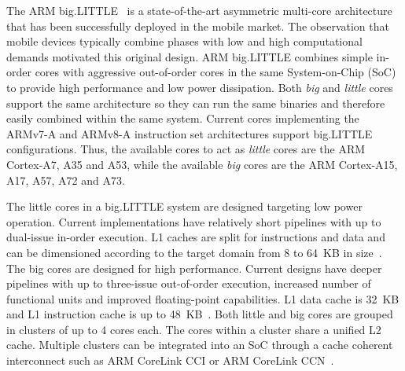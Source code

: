 
The ARM big.LITTLE~\cite{samsung, Greenhalgh2011} is a state-of-the-art asymmetric multi-core architecture that has been successfully deployed in the mobile market. The observation that mobile devices typically combine phases with low and high computational demands motivated this original design. ARM big.LITTLE combines simple in-order cores with aggressive out-of-order cores in the same System-on-Chip (SoC) to provide high performance and low power dissipation. Both \textit{big} and \textit{little} cores support the same architecture so they can run the same binaries and therefore easily combined within the same system.
% 
Current cores implementing the ARMv7-A and ARMv8-A instruction set architectures support 
big.LIT\-TLE configurations. Thus, the available cores to act as \textit{little} cores are the ARM 
Cortex-A7, A35 and A53, while the available \textit{big} cores are the ARM Cortex-A15, A17, A57, A72 and A73.

The little cores in a big.LITTLE system are designed targeting low power operation. Current implementations have relatively short pipelines with up to dual-issue in-order execution. L1 caches are split for instructions and data and can be dimensioned according to the target domain from 8 to 64~KB in size~\cite{MPR_A53}. The big cores are designed for high performance. Current designs have deeper pipelines with up to three-issue out-of-order execution, increased number of functional units and improved floating-point capabilities. L1 data cache is 32~KB and L1 instruction cache is up to 48~KB~\cite{MPR_A57, MPR_A72}. Both little and big cores are grouped in clusters of up to 4 cores each. The cores within a cluster share a unified L2 cache. Multiple clusters can be integrated into an SoC through a cache coherent interconnect such as ARM CoreLink CCI or ARM CoreLink CCN~\cite{CCI}.

